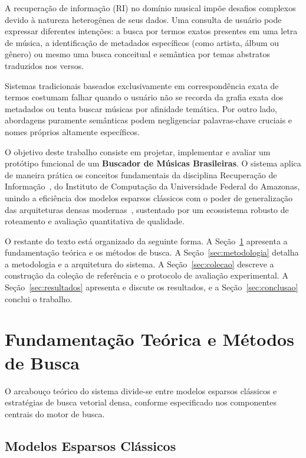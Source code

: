 \documentclass[12pt]{article}
\begin{document}
A recuperação de informação (RI) no domínio musical impõe desafios complexos
devido à natureza heterogênea de seus dados. Uma consulta de usuário pode
expressar diferentes intenções: a busca por termos exatos presentes em uma
letra de música, a identificação de metadados específicos (como artista, álbum
ou gênero) ou mesmo uma busca conceitual e semântica por temas abstratos
traduzidos nos versos.

Sistemas tradicionais baseados exclusivamente em correspondência exata de
termos costumam falhar quando o usuário não se recorda da grafia exata dos
metadados ou tenta buscar músicas por afinidade temática. Por outro lado,
abordagens puramente semânticas podem negligenciar palavras-chave cruciais e
nomes próprios altamente específicos.

O objetivo deste trabalho consiste em projetar, implementar e avaliar um
protótipo funcional de um \textbf{Buscador de Músicas Brasileiras}. O sistema
aplica de maneira prática os conceitos fundamentais da disciplina Recuperação
de Informação~\cite{manning2008introduction,baezayates1999modern}, do Instituto
de Computação da Universidade Federal do Amazonas, unindo a eficiência dos
modelos esparsos clássicos com o poder de generalização das arquiteturas densas
modernas~\cite{grainger2024aipowered}, sustentado por um ecossistema robusto de
roteamento e avaliação quantitativa de qualidade.

O restante do texto está organizado da seguinte forma. A
Seção~\ref{sec:fundamentacao} apresenta a fundamentação teórica e os métodos de
busca. A Seção~\ref{sec:metodologia} detalha a metodologia e a arquitetura do
sistema. A Seção~\ref{sec:colecao} descreve a construção da coleção de
referência e o protocolo de avaliação experimental. A
Seção~\ref{sec:resultados} apresenta e discute os resultados, e a
Seção~\ref{sec:conclusao} conclui o trabalho.

\section{Fundamentação Teórica e Métodos de Busca}
\label{sec:fundamentacao}

O arcabouço teórico do sistema divide-se entre modelos esparsos clássicos e
estratégias de busca vetorial densa, conforme especificado nos componentes
centrais do motor de busca.

\subsection{Modelos Esparsos Clássicos}
\end{document}
